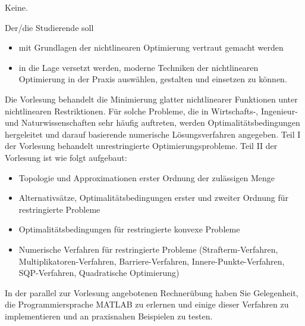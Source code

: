 \begin{course}
\begin{styleenv}
\begin{assessment}
\end{assessment}

\begin{conditions}Keine.\end{conditions}


\end{styleenv}

\begin{learningoutcomes}
Der/die Studierende soll

 \begin{itemize}\item mit Grundlagen der nichtlinearen Optimierung vertraut gemacht werden  \item in die Lage versetzt werden, moderne Techniken der nichtlinearen Optimierung in der Praxis auswählen, gestalten und einsetzen zu können.  \end{itemize}
\end{learningoutcomes}

\begin{content}
Die Vorlesung behandelt die Minimierung glatter nichtlinearer Funktionen unter nichtlinearen Restriktionen. Für solche Probleme, die in Wirtschafts-, Ingenieur- und Naturwissenschaften sehr häufig auftreten, werden Optimalitätsbedingungen hergeleitet und darauf basierende numerische Lösungsverfahren angegeben. Teil I der Vorlesung behandelt unrestringierte Optimierungsprobleme. Teil II der Vorlesung ist wie folgt aufgebaut:

 \begin{itemize}\item Topologie und Approximationen erster Ordnung der zulässigen Menge  \item Alternativsätze, Optimalitätsbedingungen erster und zweiter Ordnung für restringierte Probleme  \item Optimalitätsbedingungen für restringierte konvexe Probleme  \item Numerische Verfahren für restringierte Probleme (Strafterm-Verfahren, Multiplikatoren-Verfahren, Barriere-Verfahren, Innere-Punkte-Verfahren, SQP-Verfahren, Quadratische Optimierung)  \end{itemize}

In der parallel zur Vorlesung angebotenen Rechnerübung haben Sie Gelegenheit, die Programmiersprache MATLAB zu erlernen und einige dieser Verfahren zu implementieren und an praxisnahen Beispielen zu testen.


\end{content}




\end{course}
